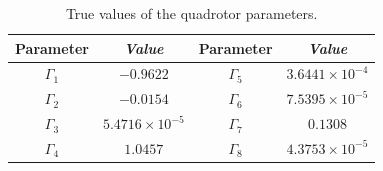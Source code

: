 \documentclass[preprint,12pt,authoryear]{elsarticle}
\begin{document}
\begin{table}[H]
	\renewcommand{\arraystretch}{1.3}
	\caption{True values of the quadrotor parameters.}
	\begin{center}
	\begin{tabular}{c c c c}
	\hline
	\textbf{Parameter} & \textbf{\textit{Value}}& \textbf{Parameter} & \textbf{\textit{Value}}  \\
	\hline
	$\Gamma_1$ & $-0.9622$ & $\Gamma_5$ & $3.6441\times10^{-4}$ \\

	$\Gamma_2$ & $-0.0154$ & $\Gamma_6$ & $7.5395\times10^{-5}$ \\

	$\Gamma_3$ &$5.4716\times10^{-5}$ & $\Gamma_7$ & $0.1308$ \\

	$\Gamma_4$ & $1.0457$ & $\Gamma_8$ & $4.3753\times10^{-5}$ \\
	\hline
	\end{tabular}
	\label{tab:true_parameters}
	\end{center}
\end{table}
\end{document}

